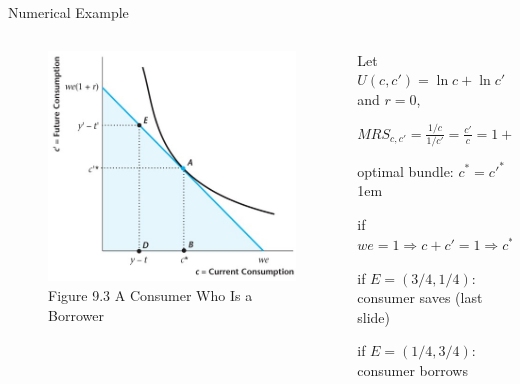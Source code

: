 \documentclass[11pt,aspectratio=43]{beamer}
\let\olditemize=\itemize
\let\endolditemize=\enditemize
\renewenvironment{itemize}{\olditemize \itemsep1em}{\endolditemize}
\theoremstyle{definition}
\begin{document}
\begin{frame}{Numerical Example}
\label{slide:Numerical_Example}
    \begin{columns}
        \begin{column}{0.5\textwidth}
            \begin{figure}
                \caption{\scriptsize Figure 9.3 A Consumer Who Is a Borrower}
                \includegraphics[width=\textwidth]{./figures/Figure9_3_2.jpg}
            \end{figure}
        \end{column}
        \begin{column}{0.5\textwidth}
            Let $ U( c, c' ) = \ln c + \ln c' $ and $ r = 0 $,

            $ \displaystyle MRS_{c, c'} = \frac{1/c}{1/c'} = \frac{c'}{c} = 1+r = 1 $

            optimal bundle: $ c^{*} = c'^{*} $
            \begin{itemize}
                \item if $ we = 1 \Rightarrow c + c' = 1 \Rightarrow c^{*} = c'^{*} = \frac{1}{2}$
                \item if $ E = ( 3/4, 1/4 ) $: consumer saves (last slide)
                \item if $ E = ( 1/4, 3/4 ) $: consumer borrows
            \end{itemize}
        \end{column}
    \end{columns}
\end{frame}
\end{document}
